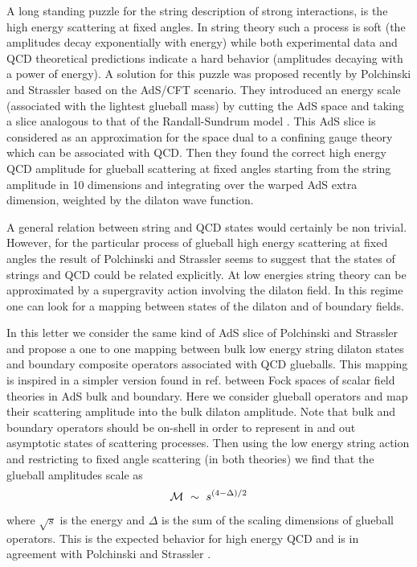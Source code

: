 \documentclass[a4paper,twocolumn,prd,groupedaddress,nofootinbib]{revtex4}
\begin{document}
A long standing puzzle 
for the string description of strong interactions, 
is the high energy scattering at fixed angles.
In string theory such a process is soft (the amplitudes decay 
exponentially with energy) while both experimental data and QCD 
theoretical predictions\cite{QCD1,BRO} indicate a hard behavior 
(amplitudes decaying with a power of energy).
A solution for this puzzle was  proposed recently by 
Polchinski and Strassler\cite{PS} based on the AdS/CFT scenario. 
They introduced an energy scale (associated with the lightest 
glueball mass) by cutting the AdS space and taking a slice 
analogous to that of the Randall-Sundrum model \cite{RS1,RS2}. 
This AdS slice is considered as an approximation for the space 
dual to a confining gauge theory which can be associated with QCD.
Then they found the correct high energy QCD amplitude for glueball 
scattering at fixed angles starting from the string amplitude in 10 
dimensions and integrating over the warped AdS extra dimension, 
weighted by the dilaton wave function.

A general relation between string and QCD states 
would certainly be non trivial. 
However, for the particular process of glueball 
high energy scattering at fixed angles 
the result of Polchinski and Strassler 
seems to suggest that the states of 
strings and QCD could be related explicitly. 
At low energies string theory can be approximated by a
supergravity action involving the dilaton field.
In this regime one can look for a mapping between states 
of the dilaton and of boundary fields.

In this letter we consider the same kind of AdS slice of Polchinski 
and Strassler \cite{PS} and propose a one to one mapping between 
bulk low energy string dilaton states and boundary composite 
operators associated with QCD glueballs.
This mapping is inspired in a simpler version found in ref.\cite{BB2} 
between Fock spaces of  scalar field theories in  AdS bulk and boundary.
Here we consider glueball operators  and map their scattering amplitude 
into the bulk dilaton amplitude.
Note that bulk and boundary operators should be on-shell in order
to represent in and out asymptotic states of scattering processes. 
Then using the low energy string action and restricting to fixed angle 
scattering (in both theories) we find that the glueball amplitudes scale 
as
\begin{equation}
\label{scale}
{\cal M} \,\,\sim \,\, s^{(4-\Delta )/2}
\end{equation}

\noindent where $\sqrt{s}$ is the energy and
 $\Delta$ is the sum of the scaling dimensions of glueball operators. 
This is the  expected behavior for high energy QCD\cite{QCD1,BRO}
and is in agreement with Polchinski and Strassler \cite{PS}. 
 
\end{document}
